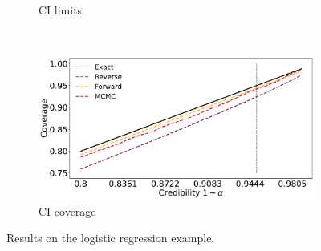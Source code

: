 \begin{figure}[ht]
\begin{subfigure}{\linewidth}
    \caption{CI limits}
    \label{fig:logreg_lims}
    \end{subfigure}\\[1ex]
    \begin{subfigure}{\linewidth}
    \centering
    \includegraphics[width=0.8\linewidth]{fig/logreg_cicoverage.pdf}
    \caption{CI coverage}
    \label{fig:logreg_coverage}
    \end{subfigure}
    \caption{Results on the logistic regression example.}
    \label{fig:logreg}
\end{figure}
